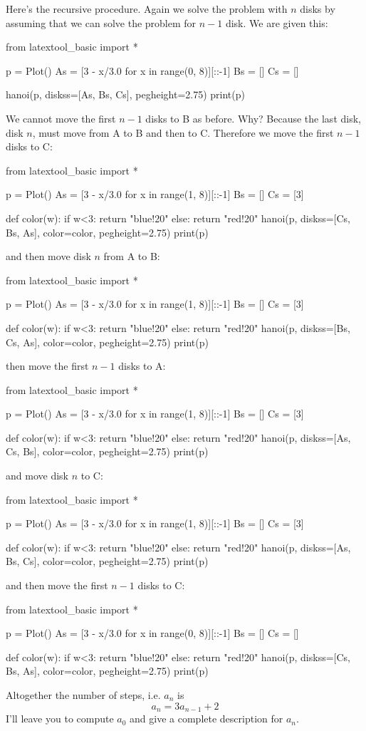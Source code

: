 Here's the recursive procedure.
Again we solve the problem with $n$ disks by 
assuming that we can solve the problem for $n-1$ disk.
We are given this:
\begin{python}
from latextool_basic import *

p = Plot()
As = [3 - x/3.0 for x in range(0, 8)][::-1]
Bs = []
Cs = []
    
hanoi(p, diskss=[As, Bs, Cs], pegheight=2.75)
print(p)
\end{python}
We cannot move the first $n-1$ disks to B as before.
Why? Because the last disk, disk $n$, must move from A to B and then to C.
Therefore we move the first $n-1$ disks to C:
\begin{python}
from latextool_basic import *

p = Plot()
As = [3 - x/3.0 for x in range(1, 8)][::-1]
Bs = []
Cs = [3]

def color(w):
    if w<3: return "blue!20"
    else: return "red!20"
hanoi(p, diskss=[Cs, Bs, As], color=color, pegheight=2.75)
print(p)
\end{python}
and then move disk $n$ from A to B:
\begin{python}
from latextool_basic import *

p = Plot()
As = [3 - x/3.0 for x in range(1, 8)][::-1]
Bs = []
Cs = [3]

def color(w):
    if w<3: return "blue!20"
    else: return "red!20"
hanoi(p, diskss=[Bs, Cs, As], color=color, pegheight=2.75)
print(p)
\end{python}
then move the first $n-1$ disks to A:
\begin{python}
from latextool_basic import *

p = Plot()
As = [3 - x/3.0 for x in range(1, 8)][::-1]
Bs = []
Cs = [3]

def color(w):
    if w<3: return "blue!20"
    else: return "red!20"
hanoi(p, diskss=[As, Cs, Bs], color=color, pegheight=2.75)
print(p)
\end{python}
and move disk $n$ to C:
\begin{python}
from latextool_basic import *

p = Plot()
As = [3 - x/3.0 for x in range(1, 8)][::-1]
Bs = []
Cs = [3]

def color(w):
    if w<3: return "blue!20"
    else: return "red!20"
hanoi(p, diskss=[As, Bs, Cs], color=color, pegheight=2.75)
print(p)
\end{python}
and then move the first $n-1$ disks to C:
\begin{python}
from latextool_basic import *

p = Plot()
As = [3 - x/3.0 for x in range(0, 8)][::-1]
Bs = []
Cs = []

def color(w):
    if w<3: return "blue!20"
    else: return "red!20"
hanoi(p, diskss=[Cs, Bs, As], color=color, pegheight=2.75)
print(p)
\end{python}
Altogether the number of steps, i.e. $a_n$ is
\[
a_n = 3a_{n-1} + 2
\]
I'll leave you to compute $a_0$ and give a complete description
for $a_n$.
